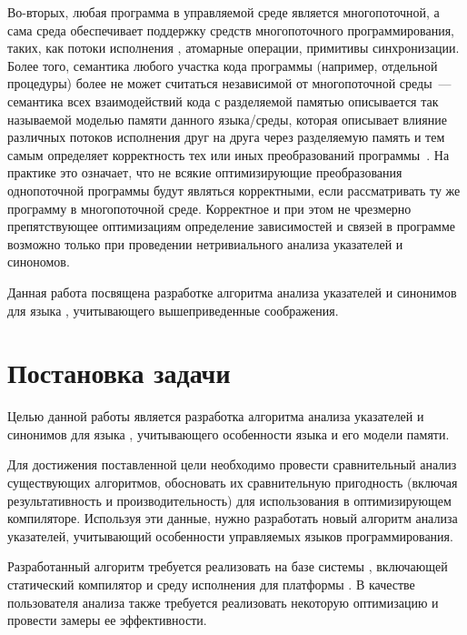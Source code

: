 \documentclass[14pt,titlepage,draft]{extarticle}
\newcommand{\java}{\eng{Java}\xspace}
\begin{document}
    Во-вторых, любая программа в управляемой среде является многопоточной, а
    сама среда обеспечивает поддержку средств многопоточного программирования,
    таких, как потоки исполнения , атомарные операции,
    примитивы синхронизации. Более того, семантика любого участка кода
    программы (например, отдельной процедуры) более не может считаться
    независимой от многопоточной среды~--- семантика всех взаимодействий кода с
    разделяемой памятью описывается так называемой моделью памяти данного
    языка/среды, которая описывает влияние различных потоков исполнения друг на
    друга через разделяемую память и тем самым определяет корректность тех или
    иных преобразований программы~\cite{manson_jmm}. На практике это означает,
    что не всякие оптимизирующие преобразования однопоточной программы будут
    являться корректными, если рассматривать ту же программу в многопоточной
    среде. Корректное и при этом не чрезмерно препятствующее оптимизациям
    определение зависимостей и связей в программе возможно только при
    проведении нетривиального анализа указателей и синономов.

    Данная работа посвящена разработке алгоритма анализа указателей и синонимов
    для языка \java, учитывающего вышеприведенные соображения.

  \section{Постановка задачи}

    Целью данной работы является разработка алгоритма анализа указателей и
    синонимов для языка \java, учитывающего особенности языка и его модели
    памяти.

    Для достижения поставленной цели необходимо провести сравнительный анализ
    существующих алгоритмов, обосновать их сравнительную пригодность (включая
    результативность и производительность) для использования в оптимизирующем
    компиляторе. Используя эти данные, нужно разработать новый алгоритм анализа
    указателей, учитывающий особенности управляемых языков программирования.

    Разработанный алгоритм требуется реализовать на базе системы , включающей статический компилятор и среду
    исполнения для платформы . В качестве пользователя анализа
    также требуется реализовать некоторую оптимизацию и провести замеры ее
    эффективности.
\end{document}
